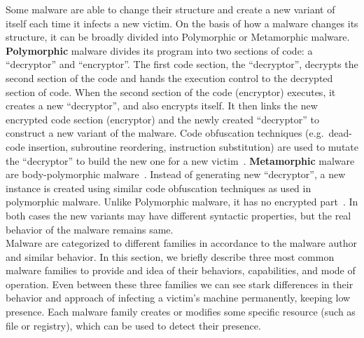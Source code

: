 Some malware are able to change their structure and create a new variant of itself each time it infects a new victim.
On the basis of how a malware changes its structure, it can be broadly divided into Polymorphic or Metamorphic malware.
\textbf{Polymorphic} malware divides its program into two sections of code: a ``decryptor'' and ``encryptor''.
The first code section, the ``decryptor'', decrypts the second section of the code and hands the execution control to the decrypted section of code.
When the second section of the code (encryptor) executes, it creates a new ``decryptor'', and also encrypts itself.
It then links the new encrypted code section (encryptor) and the newly created ``decryptor'' to construct a new variant of the malware.
Code obfuscation techniques (e.g.\ dead-code insertion, subroutine reordering, instruction substitution) are used to mutate the ``decryptor'' to build the new one for a new victim~\cite[]{rad2011evolution}.
\textbf{Metamorphic} malware are body-polymorphic malware~\cite[]{szor2001hunting}.
Instead of generating new ``decryptor'', a new instance is created using similar code obfuscation techniques as used in polymorphic malware.
Unlike Polymorphic malware, it has no encrypted part~\cite[]{rad2012camouflage}.
In both cases the new variants may have different syntactic properties, but the real behavior of the malware remains same.\\

Malware are categorized to different families in accordance to the malware author and similar behavior.
In this section, we briefly describe three most common malware families to provide and idea of their behaviors, capabilities, and mode of operation.
Even between these three families we can see stark differences in their behavior and approach of infecting a victim's machine permanently, keeping low presence.
Each malware family creates or modifies some specific resource (such as file or registry), which can be used to detect their presence.

